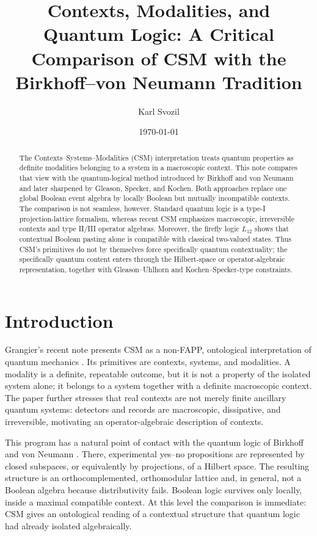 \documentclass[
aps,
pra,
reprint,
superscriptaddress,
nofootinbib,
longbibliography
]{revtex4-2}
\begin{document}
\title{Contexts, Modalities, and Quantum Logic: A Critical Comparison of CSM with the Birkhoff--von Neumann Tradition}

\author{Karl Svozil}

\date{\today}

\begin{abstract}
The Contexts--Systems--Modalities (CSM) interpretation treats quantum
properties as definite modalities belonging to a system in a macroscopic
context.  This note compares that view with the quantum-logical method
introduced by Birkhoff and von Neumann and later sharpened by Gleason,
Specker, and Kochen.  Both approaches replace one global Boolean event algebra
by locally Boolean but mutually incompatible contexts.  The comparison is not
seamless, however.  Standard quantum logic is a type-I projection-lattice
formalism, whereas recent CSM emphasizes macroscopic, irreversible contexts
and type II/III operator algebras.  Moreover, the firefly logic $L_{12}$ shows
that contextual Boolean pasting alone is compatible with classical
two-valued states.  Thus CSM's primitives do not by themselves force
specifically quantum contextuality; the specifically quantum content enters
through the Hilbert-space or operator-algebraic representation, together with
Gleason--Uhlhorn and Kochen--Specker-type constraints.
\end{abstract}

\maketitle

\section{Introduction}

Grangier's recent note presents CSM as a non-FAPP, ontological interpretation
of quantum mechanics \cite{grangier2026}.  Its primitives are contexts,
systems, and modalities.  A modality is a definite, repeatable outcome, but it
is not a property of the isolated system alone; it belongs to a system together
with a definite macroscopic context.  The paper further stresses that real
contexts are not merely finite ancillary quantum systems: detectors and
records are macroscopic, dissipative, and irreversible, motivating an
operator-algebraic description of contexts.

This program has a natural point of contact with the quantum logic of
Birkhoff and von Neumann \cite{birkhoff1936}.  There, experimental yes--no
propositions are represented by closed subspaces, or equivalently by
projections, of a Hilbert space.  The resulting structure is an
orthocomplemented, orthomodular lattice and, in general, not a Boolean
algebra because distributivity fails.  Boolean logic survives only locally,
inside a maximal compatible context.  At this level the comparison is
immediate: CSM gives an ontological reading of a contextual structure that
quantum logic had already isolated algebraically.
\end{document}
